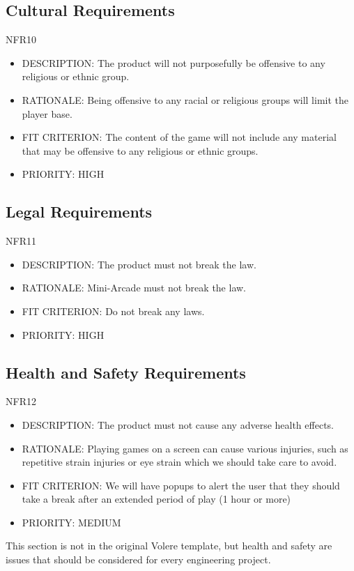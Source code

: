 \documentclass[12pt, titlepage]{article}
\begin{document}
\subsection{Cultural Requirements}
NFR10
\begin{itemize}
    \item DESCRIPTION: The product will not purposefully be offensive to any religious or ethnic group.
    \item RATIONALE: Being offensive to any racial or religious groups will limit the player base.
    \item FIT CRITERION: The content of the game will not include any material that may be offensive to any religious or ethnic groups.
    \item PRIORITY: HIGH
\end{itemize}
\subsection{Legal Requirements}
NFR11
\begin{itemize}
    \item DESCRIPTION: The product must not break the law.
    \item RATIONALE: Mini-Arcade must not break the law.
    \item FIT CRITERION: Do not break any laws.
    \item PRIORITY: HIGH
\end{itemize}

\subsection{Health and Safety Requirements}
NFR12
\begin{itemize}
    \item DESCRIPTION: The product must not cause any adverse health effects.
    \item RATIONALE: Playing games on a screen can cause various injuries, such as repetitive strain injuries
or eye strain which we should take care to avoid.
    \item FIT CRITERION: We will have popups to alert the user that they should take a 
break after an extended period of play (1 hour or more)
    \item PRIORITY: MEDIUM
\end{itemize}

This section is not in the original Volere template, but health and safety are
issues that should be considered for every engineering project.
\end{document}
